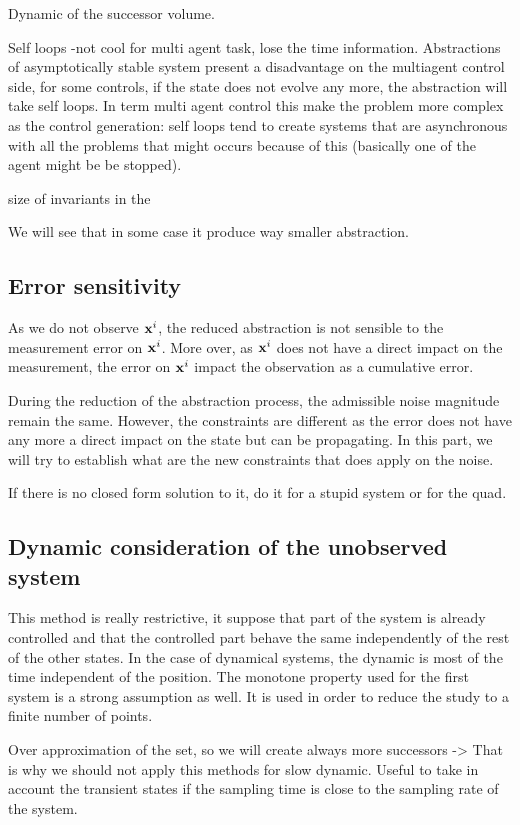 Dynamic of the successor volume.

Self loops -not cool for multi agent task, lose the time information.
Abstractions of asymptotically stable system present a disadvantage on the multiagent control side, for some controls, if the state does not evolve any more, the abstraction will take self loops.
In term multi agent control this make the problem more complex as the control generation: self loops tend to create systems that are asynchronous with all the problems that might occurs because of this (basically one of the agent might be be stopped).

size of invariants in the 


We will see that in some case it produce way smaller abstraction.

\subsection{Error sensitivity}
As we do not observe $ \mathbf{x}^i$, the reduced abstraction is not sensible to the measurement error on $ \mathbf{x}^i$. More over, as $ \mathbf{x}^i$ does not have a direct impact on the measurement, the error on $ \mathbf{x}^i$ impact the observation as a cumulative error.

During the reduction of the abstraction process, the admissible noise magnitude remain the same. However, the constraints are different as the error does not have any more a direct impact on the state but can be propagating.
In this part, we will try to establish what are the new constraints that does apply on the noise.

If there is no closed form solution to it, do it for a stupid system or for the quad.

\subsection{Dynamic consideration of the unobserved system}
This method is really restrictive, it suppose that part of the system is already controlled and that the controlled part behave the same independently of the rest of the other states. In the case of dynamical systems, the dynamic is most of the time independent of the position. 
The monotone property used for the first system is a strong assumption as well. It is used in order to reduce the study to a finite number of points.

Over approximation of the set, so we will create always more successors -> That is why we should not apply this methods for slow dynamic. Useful to take in account the transient states if the sampling time is close to the sampling rate of the system.

